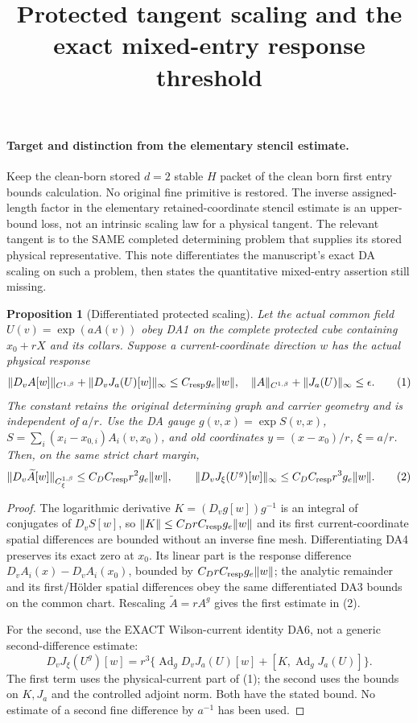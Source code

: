 \documentclass[11pt]{article}
\title{Protected tangent scaling and the exact mixed-entry response threshold}\author{}\date{}
\newtheorem{proposition}{Proposition}
\begin{document}
\maketitle
\paragraph{Target and distinction from the elementary stencil estimate.}
Keep the clean-born stored $d=2$ stable $H$ packet of the clean born first entry bounds calculation. No original fine
primitive is restored. The inverse assigned-length factor in the elementary
retained-coordinate stencil estimate is an upper-bound loss, not an intrinsic
scaling law for a physical tangent. The relevant tangent is to the SAME
completed determining problem that supplies its stored physical representative.
This note differentiates the manuscript's exact DA scaling on such a problem,
then states the quantitative mixed-entry assertion still missing.

\begin{proposition}[Differentiated protected scaling]
Let the actual common field $U(v)=\exp(a A(v))$ obey DA1 on the complete protected
cube containing $x_0+rX$ and its collars. Suppose a current-coordinate direction
$w$ has the actual physical response
\[
 \|D_vA[w]\|_{C^{1,\beta}}+
 \|D_vJ_a(U)[w]\|_\infty\le C_{\rm resp}g_e\|w\|,
 \quad \|A\|_{C^{1,\beta}}+\|J_a(U)\|_\infty\le\epsilon.       \tag{1}
\]
The constant retains the original determining graph and carrier geometry and
is independent of $a/r$. Use the DA gauge $g(v,x)=\exp S(v,x)$,
$S=\sum_i(x_i-x_{0,i})A_i(v,x_0)$, and old coordinates
$y=(x-x_0)/r$, $\xi=a/r$. Then, on the same strict chart margin,
\[
 \|D_v\widetilde A[w]\|_{C^{1,\beta}_\xi}
       \le C_D C_{\rm resp} r^2 g_e\|w\|,
 \qquad
 \|D_vJ_\xi(U^g)[w]\|_\infty
       \le C_D C_{\rm resp} r^3 g_e\|w\|.              \tag{2}
\]
\end{proposition}
\begin{proof}
The logarithmic derivative $K=(D_vg[w])g^{-1}$ is an integral of conjugates
of $D_vS[w]$, so $\|K\|\le C_D r C_{\rm resp}g_e\|w\|$ and its first
current-coordinate spatial differences are bounded without an inverse fine mesh.
Differentiating DA4 preserves its exact zero at $x_0$. Its linear part is the
response difference $D_vA_i(x)-D_vA_i(x_0)$, bounded by
$C_D r C_{\rm resp}g_e\|w\|$; the analytic remainder and its first/H\"older
spatial differences obey the same differentiated DA3 bounds on the common
chart. Rescaling $\widetilde A=r A^g$ gives the first estimate in (2).

For the second, use the EXACT Wilson-current identity DA6, not a generic
second-difference estimate:
\[
 D_vJ_\xi(U^g)[w]
 =r^3\{\operatorname{Ad}_g D_vJ_a(U)[w]
                 +[K,\operatorname{Ad}_gJ_a(U)]\}.      \tag{3}
\]
The first term uses the physical-current part of (1); the second uses the
bounds on $K,J_a$ and the controlled adjoint norm. Both have the stated bound.
No estimate of a second fine difference by $a^{-1}$ has been used.
\end{proof}
\end{document}
